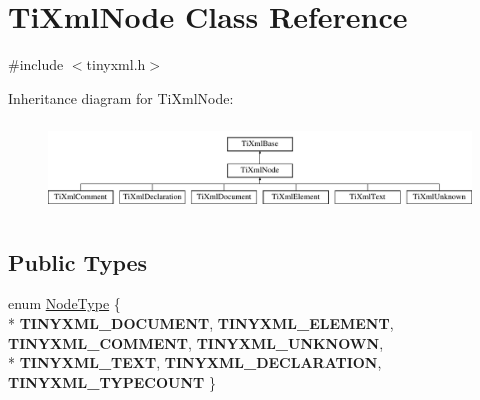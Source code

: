 \hypertarget{classTiXmlNode}{\section{Ti\-Xml\-Node Class Reference}
\label{classTiXmlNode}
}


{\ttfamily \#include $<$tinyxml.\-h$>$}

Inheritance diagram for Ti\-Xml\-Node\-:\begin{figure}[H]
\begin{center}
\leavevmode
\includegraphics[height=2.413793cm]{classTiXmlNode}
\end{center}
\end{figure}
\subsection*{Public Types}
\begin{DoxyCompactItemize}
\item 
enum \hyperlink{classTiXmlNode_a836eded4920ab9e9ef28496f48cd95a2}{Node\-Type} \{ \\*
{\bfseries T\-I\-N\-Y\-X\-M\-L\-\_\-\-D\-O\-C\-U\-M\-E\-N\-T}, 
{\bfseries T\-I\-N\-Y\-X\-M\-L\-\_\-\-E\-L\-E\-M\-E\-N\-T}, 
{\bfseries T\-I\-N\-Y\-X\-M\-L\-\_\-\-C\-O\-M\-M\-E\-N\-T}, 
{\bfseries T\-I\-N\-Y\-X\-M\-L\-\_\-\-U\-N\-K\-N\-O\-W\-N}, 
\\*
{\bfseries T\-I\-N\-Y\-X\-M\-L\-\_\-\-T\-E\-X\-T}, 
{\bfseries T\-I\-N\-Y\-X\-M\-L\-\_\-\-D\-E\-C\-L\-A\-R\-A\-T\-I\-O\-N}, 
{\bfseries T\-I\-N\-Y\-X\-M\-L\-\_\-\-T\-Y\-P\-E\-C\-O\-U\-N\-T}
 \}
\end{DoxyCompactItemize}
